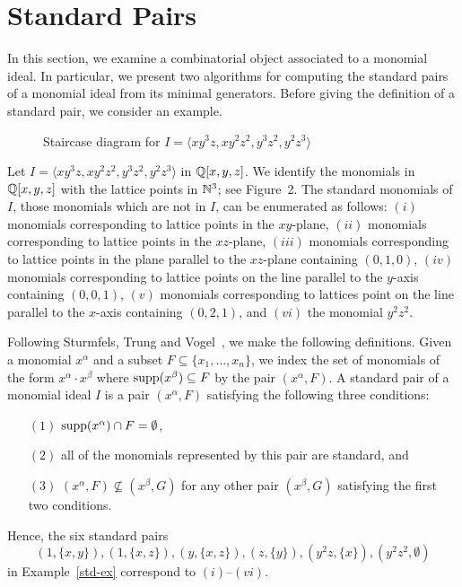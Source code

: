 \section{Standard Pairs}

In this section, we examine a combinatorial object associated to a
monomial ideal.  In particular, we present two algorithms for
computing the standard pairs of a monomial ideal from its minimal
generators.  Before giving the definition of a standard pair, we
consider an example.

\begin{figure} 
\begin{center}
\epsfysize=2.4in 
\end{center}
\caption{Staircase diagram for $I = \langle xy^3z, xy^2z^2, y^3z^2,
y^2z^3 \rangle$}
\end{figure}

\begin{example} \label{std-ex} 
Let $I = \langle xy^3z, xy^2z^2, y^3z^2, y^2z^3 \rangle$ in
${\mathbb Q}[x,y,z]$.  We identify the monomials in ${\mathbb Q}[x,y,z]$
with the lattice points in ${\mathbb N}^3$; see Figure~2.  The
standard monomials of $I$, those monomials which are not in $I$, can
be enumerated as follows: $(i)$ monomials corresponding to lattice
points in the $xy$-plane, $(ii)$ monomials corresponding to lattice
points in the $xz$-plane, $(iii)$ monomials corresponding to lattice
points in the plane parallel to the $xz$-plane containing $(0,1,0)$,
$(iv)$ monomials corresponding to lattice points on the line parallel
to the $y$-axis containing $(0,0,1)$, $(v)$ monomials corresponding to
lattices point on the line parallel to the $x$-axis containing
$(0,2,1)$, and $(vi)$ the monomial $y^{2}z^{2}$.
\end{example}

Following Sturmfels, Trung and Vogel~\cite{MR96i:13029}, we make the
following definitions.  Given a monomial $x^{\alpha}$ and a subset $F
\subseteq \{ x_{1}, \dotsc, x_{n} \}$, we index the set of monomials
of the form $x^{\alpha} \cdot x^{\beta}$ where $\operatorname{supp}(x^{\beta})
\subseteq F$ by the pair $(x^{\alpha}, F)$.  A standard
pair of a monomial ideal $I$ is a pair
$(x^{\alpha}, F)$ satisfying the following three conditions:
\begin{enumerate}
\item[$(1)$] $\operatorname{supp}(x^{\alpha}) \cap F = \emptyset$,
\item[$(2)$] all of the monomials represented by this pair are
standard, and
\item[$(3)$] $(x^{\alpha}, F) \not\subseteq (x^{\beta}, G)$ for any
other pair $(x^{\beta}, G)$ satisfying the first two conditions.
\end{enumerate}
Hence, the six standard pairs 
\[ 
(1, \{x,y\}), (1, \{x,z\}), (y,\{x,z\}), (z, \{y\}), (y^{2}z, \{x\}),
(y^2z^2, \emptyset)
\]
in Example~\ref{std-ex} correspond to $(i)$--$(vi)$.

